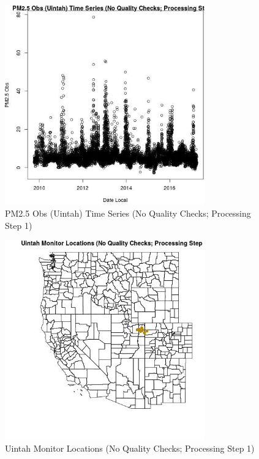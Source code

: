 
\begin{figure} 
\centering  
\includegraphics[width=0.77\textwidth]{Code_Outputs/PM25Source3TSstep1_PM25_ObsvDate_Local.jpg} 
\caption{\label{fig:PM25Source3TSstep1PM25_ObsvDate_Local}PM2.5 Obs (Uintah) Time Series (No Quality Checks; Processing Step 1)} 
\end{figure} 
 

\begin{figure} 
\centering  
\includegraphics[width=0.77\textwidth]{Code_Outputs/PM25Source3TSstep1_MapUintahLocations.jpg} 
\caption{\label{fig:PM25Source3TSstep1MapUintahLocations}Uintah Monitor Locations (No Quality Checks; Processing Step 1)} 
\end{figure} 
 
